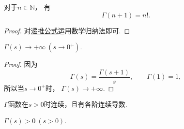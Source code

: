 \begin{property}
对于\(n\in\mathbb{N}\)，
有\begin{equation}\label{equation:定积分.伽马函数与阶乘的联系}
	\Gamma(n+1) = n!.
\end{equation}
\begin{proof}
对\hyperref[equation:伽马函数.递推公式]{递推公式}运用数学归纳法即可.
\end{proof}
\end{property}

\begin{property}
\(\Gamma(s)\to+\infty\ (s\to0^+)\).
\begin{proof}
因为\[
	\Gamma(s) = \frac{\Gamma(s+1)}{s},
	\qquad
	\Gamma(1) = 1,
\]
所以当\(s\to0^+\)时，
\(\Gamma(s)\to+\infty\).
\end{proof}
\end{property}

\begin{proposition}
\(\Gamma\)函数在\(s > 0\)时连续，且有各阶连续导数.
\end{proposition}

\begin{proposition}
\(\Gamma(s) > 0\ (s>0)\).
\end{proposition}

